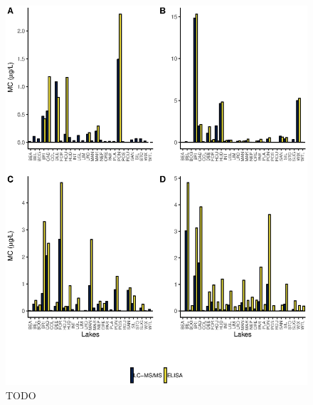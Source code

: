 \begin{figure}[!h]
	\includegraphics[width=\textwidth]{figures/compare}
	\caption{TODO}
	\label{fig:compare}
\end{figure}



